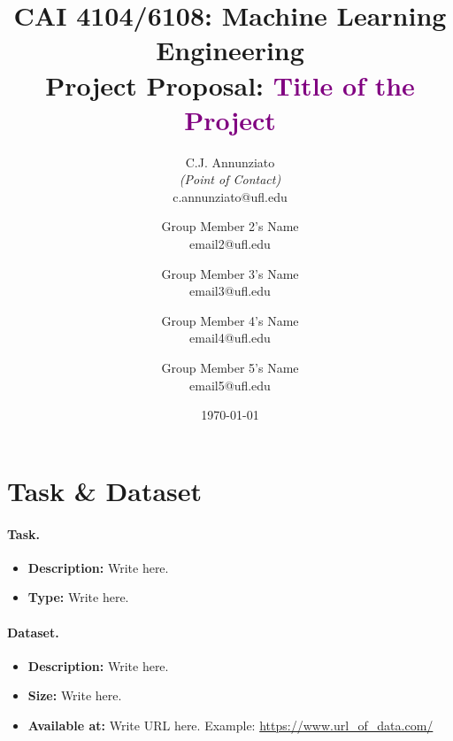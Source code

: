 \documentclass[10pt]{article}
\title{CAI 4104/6108: Machine Learning Engineering\\
	\Large Project Proposal: {\textcolor{purple}{Title of the Project}}} %
\author{
        C.J. Annunziato \\{\em (Point of Contact)} \\
        c.annunziato@ufl.edu\\
        \and
        Group Member 2's Name \\
        email2@ufl.edu\\
        \and
        Group Member 3's Name \\
        email3@ufl.edu\\
        \and
        Group Member 4's Name \\
        email4@ufl.edu\\
        \and
        Group Member 5's Name \\
        email5@ufl.edu\\
}
\date{\today}
\begin{document}

\maketitle




\section*{Task \& Dataset}


\paragraph{Task.} 

\begin{itemize}

\item {\bf Description: } Write here. %

\item {\bf Type: } Write here. %

\end{itemize}

\paragraph{Dataset.} 
%
\begin{itemize}

\item {\bf Description: } Write here. %

\item {\bf Size: } Write here. %

\item {\bf Available at: } Write URL here. Example: \url{https://www.url\_of\_data.com/} %

\end{itemize}
\end{document}
